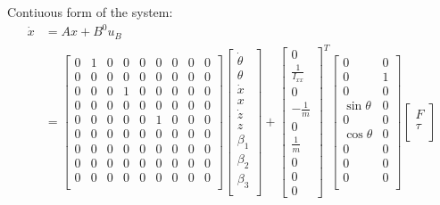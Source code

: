 \documentclass[12pt]{article}
\begin{document}
Contiuous form of the system:
\begin{align*}
    \dot{x} &= Ax + B^{0} u_{B} \\
    &= \begin{bmatrix}
        0 & 1 & 0 & 0 & 0 & 0 & 0 & 0 & 0 \\
        0 & 0 & 0 & 0 & 0 & 0 & 0 & 0 & 0 \\
        0 & 0 & 0 & 1 & 0 & 0 & 0 & 0 & 0 \\
        0 & 0 & 0 & 0 & 0 & 0 & 0 & 0 & 0 \\
        0 & 0 & 0 & 0 & 0 & 1 & 0 & 0 & 0 \\
        0 & 0 & 0 & 0 & 0 & 0 & 0 & 0 & 0 \\
        0 & 0 & 0 & 0 & 0 & 0 & 0 & 0 & 0 \\
        0 & 0 & 0 & 0 & 0 & 0 & 0 & 0 & 0 \\
        0 & 0 & 0 & 0 & 0 & 0 & 0 & 0 & 0 \\
    \end{bmatrix} \begin{bmatrix}
        \dot{\theta} \\
        \theta \\
        \dot{x} \\
        x \\
        \dot{z} \\
        z \\
        \beta_1 \\
        \beta_2 \\
        \beta_3 \\
    \end{bmatrix} + \begin{bmatrix}
        0 \\ \frac{1}{I_{xx}} \\ 0 \\ -\frac{1}{m} \\ 0 \\ \frac{1}{m} \\  0 \\ 0 \\ 0
        \end{bmatrix}^{T} \begin{bmatrix}
            0 & 0 \\
            0 & 1 \\
            0 & 0 \\
            \sin{\theta} & 0 \\
            0 & 0 \\
            \cos{\theta} & 0 \\
            0 & 0 \\
            0 & 0 \\
            0 & 0 \\
        \end{bmatrix} \begin{bmatrix}
            F \\
            \tau \\
        \end{bmatrix}
\end{align*}
\end{document}
